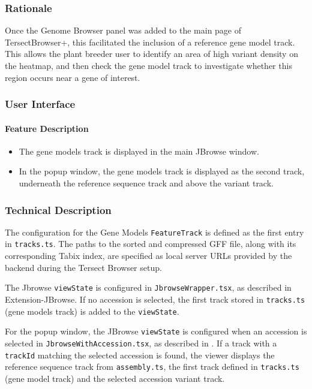 \documentclass[12pt]{article}
\begin{document}
\begin{itemize}
\subsubsection{Rationale}
Once the Genome Browser panel was added to the main page of TersectBrowser+, this facilitated the inclusion of a reference gene model track. This allows the plant breeder user to identify an area of high variant density on the heatmap, and then check the gene model track to investigate whether this region occurs near a gene of interest.

\subsubsection{User Interface}
\paragraph{Feature Description}
\begin{itemize}
    \item The gene models track is displayed in the main JBrowse window. 
    \item In the popup window, the gene models track is displayed as the second track, underneath the reference sequence track and above the variant track.
\end{itemize}

\subsubsection{Technical Description}
The configuration for the Gene Models \verb+FeatureTrack+ is defined as the first entry in \verb+tracks.ts+. The paths to the sorted and compressed GFF file, along with its corresponding Tabix index, are specified as local server URLs provided by the backend during the Tersect Browser setup. 

The Jbrowse \verb+viewState+ is configured in \verb+JbrowseWrapper.tsx+, as described in Extension-JBrowse. If no accession is selected, the first track stored in \verb+tracks.ts+ (gene models track) is added to the \verb+viewState+.

For the popup window, the JBrowse \verb+viewState+ is configured when an accession is selected in \verb+JbrowseWithAccession.tsx+, as described in . If a track with a \verb+trackId+ matching the selected accession is found, the viewer displays the reference sequence track from \verb+assembly.ts+, the first track defined in \verb+tracks.ts+ (gene model track) and the selected accession variant track. 


\end{itemize}
\end{document}
